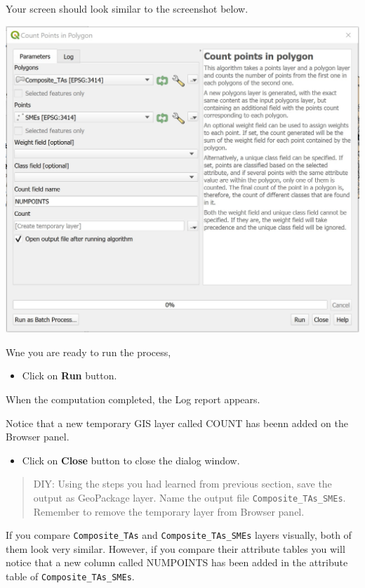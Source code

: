 \documentclass[
  letterpaper,
  DIV=11,
  numbers=noendperiod]{scrreprt}
\providecommand{\tightlist}{%
  \setlength{\itemsep}{0pt}\setlength{\parskip}{0pt}}\usepackage{longtable,booktabs,array}
\begin{document}
Your screen should look similar to the screenshot below.

\includegraphics{./img05/image26.jpg}

Wne you are ready to run the process,

\begin{itemize}
\tightlist
\item
  Click on \textbf{Run} button.
\end{itemize}

When the computation completed, the Log report appears.

Notice that a new temporary GIS layer called COUNT has beenn added on
the Browser panel.

\begin{itemize}
\tightlist
\item
  Click on \textbf{Close} button to close the dialog window.
\end{itemize}

\begin{quote}
DIY: Using the steps you had learned from previous section, save the
output as GeoPackage layer. Name the output file
\texttt{Composite\_TAs\_SMEs}. Remember to remove the temporary layer
from Browser panel.
\end{quote}

If you compare \texttt{Composite\_TAs} and \texttt{Composite\_TAs\_SMEs}
layers visually, both of them look very similar. However, if you compare
their attribute tables you will notice that a new column called
NUMPOINTS has been added in the attribute table of
\texttt{Composite\_TAs\_SMEs}.
\end{document}
